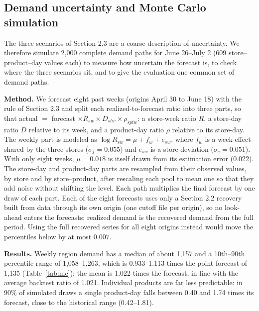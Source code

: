 
\subsection{Demand uncertainty and Monte Carlo simulation}
The three scenarios of Section 2.3 are a coarse description of uncertainty. We therefore simulate 2{,}000 complete demand paths for June 26--July 2 (609 store--product--day values each) to measure how uncertain the forecast is, to check where the three scenarios sit, and to give the evaluation one common set of demand paths.

\textbf{Method.} We forecast eight past weeks (origins April 30 to June 18) with the rule of Section 2.3 and split each realized-to-forecast ratio into three parts, so that actual $=$ forecast $\times R_{sw}\times D_{stw}\times\rho_{sptw}$: a store-week ratio $R$, a store-day ratio $D$ relative to its week, and a product-day ratio $\rho$ relative to its store-day. The weekly part is modeled as $\log R_{sw}=\mu+f_w+e_{sw}$, where $f_w$ is a week effect shared by the three stores ($\sigma_f=0.055$) and $e_{sw}$ is a store deviation ($\sigma_e=0.051$). With only eight weeks, $\mu=0.018$ is itself drawn from its estimation error (0.022). The store-day and product-day parts are resampled from their observed values, by store and by store--product, after rescaling each pool to mean one so that they add noise without shifting the level. Each path multiplies the final forecast by one draw of each part. Each of the eight forecasts uses only a Section 2.2 recovery built from data through its own origin (one cutoff file per origin), so no look-ahead enters the forecasts; realized demand is the recovered demand from the full period. Using the full recovered series for all eight origins instead would move the percentiles below by at most 0.007.

\textbf{Results.} Weekly region demand has a median of about 1{,}157 and a 10th--90th percentile range of 1{,}058--1{,}263, which is 0.933--1.113 times the point forecast of 1{,}135 (Table~\ref{tab:mc}); the mean is 1.022 times the forecast, in line with the average backtest ratio of 1.021. Individual products are far less predictable: in 90\% of simulated draws a single product-day falls between 0.40 and 1.74 times its forecast, close to the historical range (0.42--1.81).

